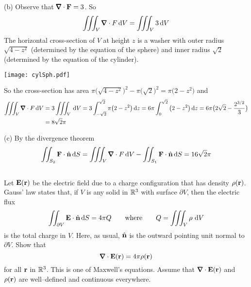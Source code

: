 \begin{solution}
(b) Observe that $\vnabla\cdot \vF=3$. So
\begin{equation*}
\tripInt_V\vnabla\cdot F\,\dee{V}
=\tripInt_V 3\,\dee{V}
\end{equation*}
The horizontal cross-section of $V$ at height $z$ is a washer with outer
radius $\sqrt{4-z^2}$ (determined by the equation of the sphere) and inner
radius $\sqrt{2}$ (determined by the equation of the cylinder).
\begin{center}
       \texttt{[image: cylSph.pdf]}
\end{center}
So the cross-section has area 
$\pi\big(\sqrt{4-z^2}\big)^2-\pi\big(\sqrt{2}\big)^2=\pi\big(2-z^2\big)$
and
\begin{align*}
\tripInt_V\vnabla\cdot F\,\dee{V}
&=3\tripInt_V \,\dee{V}
=3\int_{-\sqrt{2}}^{\sqrt{2}} \pi\big(2-z^2\big)\,\dee{z}
=6\pi \int_{0}^{\sqrt{2}} \big(2-z^2\big)\,\dee{z}
=6\pi\big(2\sqrt{2}-\frac{2^{3/2}}{3}\big) \\
&=8\sqrt{2}\pi
\end{align*}

(c)
By the divergence theorem
$$
\dblInt_{S_2}\vF\cdot \hn\,\dee{S}
=\tripInt_V\vnabla\cdot F\,\dee{V}
-\dblInt_{S_1}\vF\cdot \hn\,\dee{S}
=16\sqrt{2}\pi
$$
\end{solution}


\subsection*{\Application}

\begin{question}
Let $\mathbf{E}(\mathbf{r})$ be the electric field due to a charge
configuration that has density $\rho(\mathbf{r})$. Gauss' law states that, if
$V$ is any solid in $\mathbb{R}^3$ with surface $\partial V$, then the electric
flux 
\begin{equation*}
\iint_{\partial V}\mathbf{E}\cdot\hat{\mathbf{n}}\, \mathrm{d}S=4\pi Q
\qquad{\rm where}\qquad Q=\iiint_V\rho\ \mathrm{d}V
\end{equation*}
is the total charge  in $V$. Here, as usual, $\hat{\mathbf{n}}$ is the outward pointing
unit normal to $\partial V$. Show that
\begin{equation*}
\vnabla\cdot\vE(\vr)=4\pi \rho(\vr)
\end{equation*}
for all $\mathbf{r}$ in $\mathbb{R}^3$. This is one of Maxwell's equations.
Assume that $\vnabla\cdot\vE(\vr)$ and $ \rho(\mathbf{r})$ are well--defined and continuous
everywhere.
\end{question}

